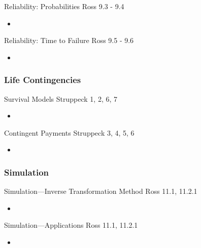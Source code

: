 \begin{CHPT_SUMM_AUTO_NUMB}[label = {L.-18}]{Reliability: Probabilities}
Ross 9.3 - 9.4
	\begin{itemize}
		\item	
	\end{itemize}
\end{CHPT_SUMM_AUTO_NUMB}

\begin{CHPT_SUMM_AUTO_NUMB}[label = {L.-19}]{Reliability: Time to Failure}
Ross 9.5 - 9.6
	\begin{itemize}
		\item	
	\end{itemize}
\end{CHPT_SUMM_AUTO_NUMB}

\subsubsection*{Life Contingencies}

\begin{CHPT_SUMM_AUTO_NUMB}[label = {L.-20}]{Survival Models}
Struppeck 1, 2, 6, 7
	\begin{itemize}
		\item	
	\end{itemize}
\end{CHPT_SUMM_AUTO_NUMB}

\begin{CHPT_SUMM_AUTO_NUMB}[label = {L.-21}]{Contingent Payments}
Struppeck 3, 4, 5, 6
	\begin{itemize}
		\item	
	\end{itemize}
\end{CHPT_SUMM_AUTO_NUMB}

\subsubsection*{Simulation}

\begin{CHPT_SUMM_AUTO_NUMB}[label = {L.-22}]{Simulation---Inverse Transformation Method}
Ross 11.1, 11.2.1
	\begin{itemize}
		\item	
	\end{itemize}
\end{CHPT_SUMM_AUTO_NUMB}

\begin{CHPT_SUMM_AUTO_NUMB}[label = {L.-23}]{Simulation---Applications}
Ross 11.1, 11.2.1
	\begin{itemize}
		\item	
	\end{itemize}
\end{CHPT_SUMM_AUTO_NUMB}


